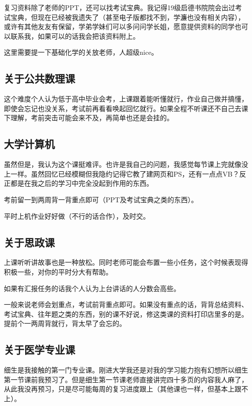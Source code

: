 \documentclass[zihao=-4,fontset=none]{Beautybook-CN}
\begin{document}
复习资料除了老师的PPT，还可以找考试宝典。我记得19级启德书院院会出过考试宝典，但现在已经被我遗失了（甚至电子版都找不到，学濂也没有相关内容），或许有其他友友有保留，学弟学妹们可以多问问学长姐，愿意提供资料的同学也可以联系我，如果可以的话我会把该资料附上。

这里需要提一下基础化学的关放老师，人超级nice。

\subsection{关于公共数理课}

这个难度个人认为低于高中毕业会考，上课跟着能听懂就行，作业自己做并搞懂，即使会忘记也没关系，考试前再看看唤起回忆就行。如果全程不听课还不自己去课下理解，考前突击可能会来不及，再简单也还是会挂的。

\subsection{大学计算机}

虽然但是，我认为这个课挺难评。也许是我自己的问题，我感觉每节课上完就像没上一样。虽然回忆已经模糊但我隐约记得它教了建网页和PS，还有一点点VB？反正都是在我之后的学习中完全没起到作用的东西。

考前留一到两周背一背重点即可（PPT及考试宝典之类的东西）。

平时上机作业好好做（不行的话合作），及时交。

\subsection{关于思政课}

上课听听讲故事也是一种放松。同时老师可能会布置一些小任务，这个时候表现得积极一些，对你的平时分大有帮助。

如果有汇报任务的话我个人认为上台讲话的人分数会高些。

一般来说老师会划重点，考试前背重点即可。如果没有重点的话，背背总结资料、考试宝典、往年题之类的东西，别的课不好说，修这类课的资料打印店里多的是。提前个一两周背就行，背太早了会忘的。

\subsection{关于医学专业课}

细生是我接触的第一门专业课。刚进大学我还是对我的学习能力抱有幻想所以细生第一节课前我预习了。但是细生第一节课老师直接讲完四十多页的内容我人麻了，从此我没再预习，只是尽可能每周的复习进度跟上（其他课也一样，但基本上跟不上）。
\end{document}
